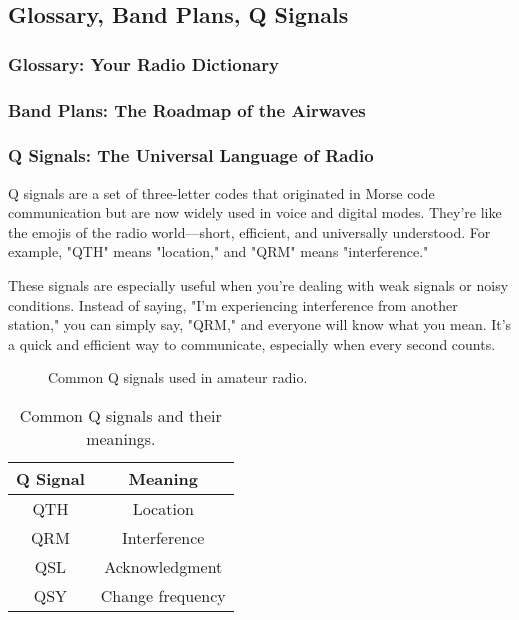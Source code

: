 \subsection{Glossary, Band Plans, Q Signals}
\label{subsec:glossary-band-q}

\subsubsection*{Glossary: Your Radio Dictionary}

\subsubsection*{Band Plans: The Roadmap of the Airwaves}

\subsubsection*{Q Signals: The Universal Language of Radio}
Q signals are a set of three-letter codes that originated in Morse code communication but are now widely used in voice and digital modes. They’re like the emojis of the radio world—short, efficient, and universally understood. For example, "QTH" means "location," and "QRM" means "interference."

These signals are especially useful when you’re dealing with weak signals or noisy conditions. Instead of saying, "I’m experiencing interference from another station," you can simply say, "QRM," and everyone will know what you mean. It’s a quick and efficient way to communicate, especially when every second counts.

\begin{figure}[h!]
    \centering
    \caption{Common Q signals used in amateur radio.}
    \label{fig:q-signals}
\end{figure}

\begin{table}[h!]
    \centering
    \begin{tabular}{|c|c|}
        \hline
        \textbf{Q Signal} & \textbf{Meaning} \\
        \hline
        QTH & Location \\
        QRM & Interference \\
        QSL & Acknowledgment \\
        QSY & Change frequency \\
        \hline
    \end{tabular}
    \caption{Common Q signals and their meanings.}
    \label{tab:q-signals}
\end{table}

